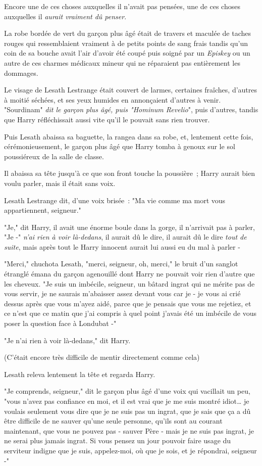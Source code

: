 Encore une de ces choses auxquelles il n'avait pas pensées, une de ces choses auxquelles il \emph{aurait vraiment dû penser}.

La robe bordée de vert du garçon plus âgé était de travers et maculée de taches rouges qui ressemblaient vraiment à de petits points de sang frais tandis qu'un coin de sa bouche avait l'air d'avoir été coupé puis soigné par un \emph{Episkey} ou un autre de ces charmes médicaux mineur qui ne réparaient pas entièrement les dommages.

Le visage de Lesath Lestrange était couvert de larmes, certaines fraîches, d'autres à moitié séchées, et ses yeux humides en annonçaient d'autres à venir. "Sourdinam" \emph{dit le garçon plus âgé, puis "Hominum Revelio}", puis d'autres, tandis que Harry réfléchissait aussi vite qu'il le pouvait sans rien trouver.

Puis Lesath abaissa sa baguette, la rangea dans sa robe, et, lentement cette fois, cérémonieusement, le garçon plus âgé que Harry tomba à genoux sur le sol poussiéreux de la salle de classe.

Il abaissa sa tête jusqu'à ce que son front touche la poussière~; Harry aurait bien voulu parler, mais il était sans voix.

Lesath Lestrange dit, d'une voix brisée~: "Ma vie comme ma mort vous appartiennent, seigneur."

"Je," dit Harry, il avait une énorme boule dans la gorge, il n'arrivait pas à parler, "Je -" \emph{n'ai rien à voir là-dedans}, il aurait dû le dire, il aurait dû le dire \emph{tout de suite}, mais après tout le Harry innocent aurait lui aussi eu du mal à parler -

"Merci," chuchota Lesath, "merci, seigneur, oh, merci," le bruit d'un sanglot étranglé émana du garçon agenouillé dont Harry ne pouvait voir rien d'autre que les cheveux. "Je suis un imbécile, seigneur, un bâtard ingrat qui ne mérite pas de vous servir, je ne saurais m'abaisser assez devant vous car je - je vous ai crié dessus après que vous m'ayez aidé, parce que je pensais que vous me rejetiez, et ce n'est que ce matin que j'ai compris à quel point j'avais été un imbécile de vous poser la question face à Londubat -"

"Je n'ai rien à voir là-dedans," dit Harry.

(C'était encore très difficile de mentir directement comme cela)

Lesath releva lentement la tête et regarda Harry.

"Je comprends, seigneur," dit le garçon plus âgé d'une voix qui vacillait un peu, "vous n'avez pas confiance en moi, et il est vrai que je me suis montré idiot… je voulais seulement vous dire que je ne suis pas un ingrat, que je sais que ça a dû être difficile de ne sauver qu'une seule personne, qu'ils sont au courant maintenant, que vous ne pouvez pas - sauver Père - mais je ne suis pas ingrat, je ne serai plus jamais ingrat. Si vous pensez un jour pouvoir faire usage du serviteur indigne que je suis, appelez-moi, où que je sois, et je répondrai, seigneur -"

